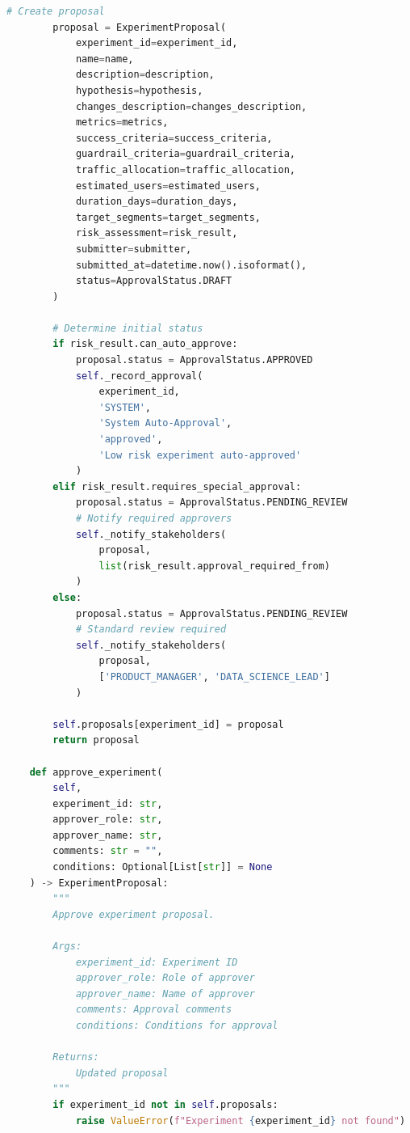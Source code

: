 \begin{lstlisting}[language=Python, caption={Experiment Governance and Approval Workflows}]
        # Create proposal
        proposal = ExperimentProposal(
            experiment_id=experiment_id,
            name=name,
            description=description,
            hypothesis=hypothesis,
            changes_description=changes_description,
            metrics=metrics,
            success_criteria=success_criteria,
            guardrail_criteria=guardrail_criteria,
            traffic_allocation=traffic_allocation,
            estimated_users=estimated_users,
            duration_days=duration_days,
            target_segments=target_segments,
            risk_assessment=risk_result,
            submitter=submitter,
            submitted_at=datetime.now().isoformat(),
            status=ApprovalStatus.DRAFT
        )

        # Determine initial status
        if risk_result.can_auto_approve:
            proposal.status = ApprovalStatus.APPROVED
            self._record_approval(
                experiment_id,
                'SYSTEM',
                'System Auto-Approval',
                'approved',
                'Low risk experiment auto-approved'
            )
        elif risk_result.requires_special_approval:
            proposal.status = ApprovalStatus.PENDING_REVIEW
            # Notify required approvers
            self._notify_stakeholders(
                proposal,
                list(risk_result.approval_required_from)
            )
        else:
            proposal.status = ApprovalStatus.PENDING_REVIEW
            # Standard review required
            self._notify_stakeholders(
                proposal,
                ['PRODUCT_MANAGER', 'DATA_SCIENCE_LEAD']
            )

        self.proposals[experiment_id] = proposal
        return proposal

    def approve_experiment(
        self,
        experiment_id: str,
        approver_role: str,
        approver_name: str,
        comments: str = "",
        conditions: Optional[List[str]] = None
    ) -> ExperimentProposal:
        """
        Approve experiment proposal.

        Args:
            experiment_id: Experiment ID
            approver_role: Role of approver
            approver_name: Name of approver
            comments: Approval comments
            conditions: Conditions for approval

        Returns:
            Updated proposal
        """
        if experiment_id not in self.proposals:
            raise ValueError(f"Experiment {experiment_id} not found")


\end{lstlisting}
